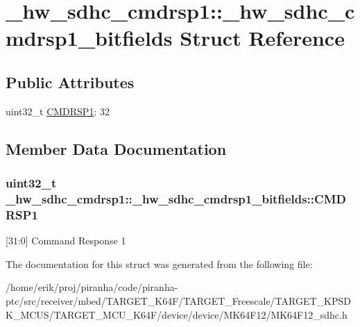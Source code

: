\hypertarget{struct__hw__sdhc__cmdrsp1_1_1__hw__sdhc__cmdrsp1__bitfields}{}\section{\+\_\+hw\+\_\+sdhc\+\_\+cmdrsp1\+:\+:\+\_\+hw\+\_\+sdhc\+\_\+cmdrsp1\+\_\+bitfields Struct Reference}
\label{struct__hw__sdhc__cmdrsp1_1_1__hw__sdhc__cmdrsp1__bitfields}
\subsection*{Public Attributes}
\begin{DoxyCompactItemize}
\item 
uint32\+\_\+t \hyperlink{struct__hw__sdhc__cmdrsp1_1_1__hw__sdhc__cmdrsp1__bitfields_ae797280bda934746cf96524aa0227a76}{C\+M\+D\+R\+S\+P1}\+: 32
\end{DoxyCompactItemize}


\subsection{Member Data Documentation}
\subsubsection[{\texorpdfstring{C\+M\+D\+R\+S\+P1}{CMDRSP1}}]{\setlength{\rightskip}{0pt plus 5cm}uint32\+\_\+t \+\_\+hw\+\_\+sdhc\+\_\+cmdrsp1\+::\+\_\+hw\+\_\+sdhc\+\_\+cmdrsp1\+\_\+bitfields\+::\+C\+M\+D\+R\+S\+P1}\hypertarget{struct__hw__sdhc__cmdrsp1_1_1__hw__sdhc__cmdrsp1__bitfields_ae797280bda934746cf96524aa0227a76}{}\label{struct__hw__sdhc__cmdrsp1_1_1__hw__sdhc__cmdrsp1__bitfields_ae797280bda934746cf96524aa0227a76}
\mbox{[}31\+:0\mbox{]} Command Response 1 

The documentation for this struct was generated from the following file\+:\begin{DoxyCompactItemize}
\item 
/home/erik/proj/piranha/code/piranha-\/ptc/src/receiver/mbed/\+T\+A\+R\+G\+E\+T\+\_\+\+K64\+F/\+T\+A\+R\+G\+E\+T\+\_\+\+Freescale/\+T\+A\+R\+G\+E\+T\+\_\+\+K\+P\+S\+D\+K\+\_\+\+M\+C\+U\+S/\+T\+A\+R\+G\+E\+T\+\_\+\+M\+C\+U\+\_\+\+K64\+F/device/device/\+M\+K64\+F12/M\+K64\+F12\+\_\+sdhc.\+h\end{DoxyCompactItemize}
